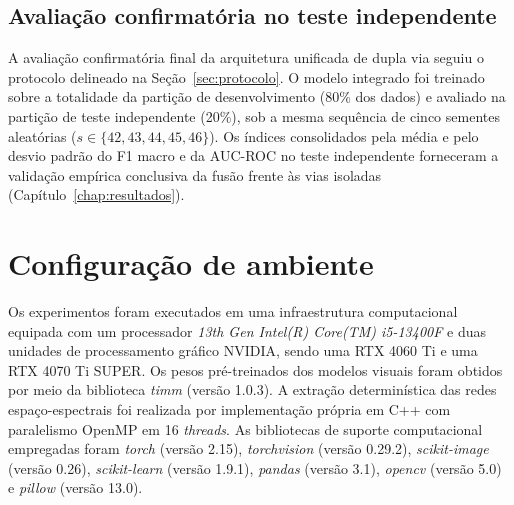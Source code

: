 \subsection{Avaliação confirmatória no teste independente}
\label{subsec:aval-confirmatoria}

A avaliação confirmatória final da arquitetura unificada de dupla via seguiu o protocolo delineado na Seção~\ref{sec:protocolo}. O modelo integrado foi treinado sobre a totalidade da partição de desenvolvimento (80\% dos dados) e avaliado na partição de teste independente (20\%), sob a mesma sequência de cinco sementes aleatórias ($s \in \{42, 43, 44, 45, 46\}$). Os índices consolidados pela média e pelo desvio padrão do F1 macro e da AUC-ROC no teste independente forneceram a validação empírica conclusiva da fusão frente às vias isoladas (Capítulo~\ref{chap:resultados}).

\section{Configuração de ambiente}
\label{sec:env}

Os experimentos foram executados em uma infraestrutura computacional equipada com um processador \textit{13th Gen Intel(R) Core(TM) i5-13400F} e duas unidades de processamento gráfico NVIDIA, sendo uma RTX 4060 Ti e uma RTX 4070 Ti SUPER. Os pesos pré-treinados dos modelos visuais foram obtidos por meio da biblioteca \textit{timm} (versão 1.0.3). A extração determinística das redes espaço-espectrais foi realizada por implementação própria em C++ com paralelismo OpenMP em 16 \textit{threads}. As bibliotecas de suporte computacional empregadas foram \textit{torch} (versão 2.15), \textit{torchvision} (versão 0.29.2), \textit{scikit-image} (versão 0.26), \textit{scikit-learn} (versão 1.9.1), \textit{pandas} (versão 3.1), \textit{opencv} (versão 5.0) e \textit{pillow} (versão 13.0).
 
